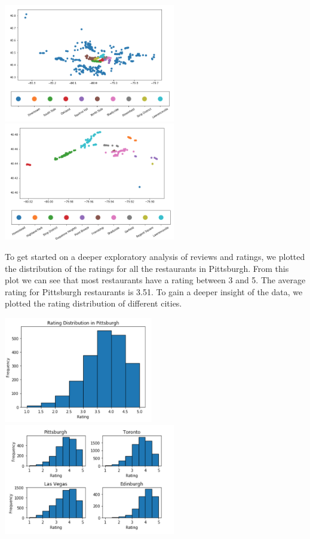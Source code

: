 \documentclass{neu_handout}
\begin{document}
\begin{center}
\includegraphics[width=75mm,scale=0.5]{pitts_hoods_most_restaurants}
\includegraphics[width=75mm,scale=0.5]{top_10_most_popular_neighborhoods}
\end{center}

To get started on a deeper exploratory analysis of reviews and ratings, we plotted the distribution of the ratings for all the restaurants in Pittsburgh. From this plot we can see that most restaurants have a rating between 3 and 5. The average rating for Pittsburgh restaurants is 3.51. To gain a deeper insight of the data, we plotted the rating distribution of different cities. 

\begin{center}
	\includegraphics[width=65mm,scale=0.3]{rating_distribution_in_Pittsburgh}
	\includegraphics[width=75mm,scale=0.3]{rating_distribution_vs_countries}
\end{center}
\end{document}
